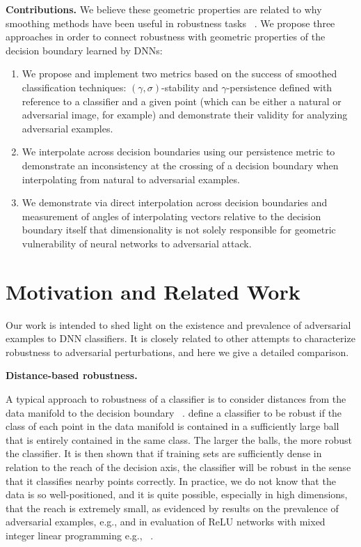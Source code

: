 {\bf Contributions.} We believe these geometric properties are related
to why smoothing methods have been useful in robustness tasks
~\citep{cohen2019certified, lecuyer2019certified, li2019certified}. We propose three approaches in order to connect robustness with geometric properties of the decision boundary learned by DNNs: 
\begin{enumerate}
    \item We propose and implement two metrics based on the success of smoothed classification techniques:  $(\gamma,\sigma)$-stability and $\gamma$-persistence defined with reference to a classifier and a given point (which can be either a natural or adversarial image, for example) and demonstrate their validity for analyzing adversarial examples. 
    \item We interpolate across decision boundaries using our persistence metric to demonstrate an inconsistency at the crossing of a decision boundary when interpolating from natural to adversarial examples.
    \item We demonstrate via direct interpolation across decision boundaries and measurement of angles of interpolating vectors relative to the decision boundary itself that dimensionality is not solely responsible for geometric vulnerability of neural networks to adversarial attack. 
\end{enumerate}

\section{Motivation and Related Work}

Our work is intended to shed light on the existence and prevalence of adversarial examples to DNN classifiers. It is closely related to other attempts to characterize robustness to adversarial perturbations, and here we give a detailed comparison.

{\bf Distance-based robustness.}

A typical approach to robustness of a classifier is to consider
distances from the data manifold to the decision boundary
~\citep{Wang2020Improving, xu2023exploring, he2018decision}.
\citet{khoury2018} define a classifier to be robust if the class of
each point in the data manifold is contained in a sufficiently large
ball that is entirely contained in the same class. The larger the
balls, the more robust the classifier. It is then shown that if
training sets are sufficiently dense in relation to the reach of the
decision axis, the classifier will be robust in the sense that it
classifies nearby points correctly. In practice, we do not know that
the data is so well-positioned, and it is quite possible, especially
in high dimensions, that the reach is extremely small, as evidenced by
results on the prevalence of adversarial examples, e.g.,
\citet{inevitable2018} and in evaluation of ReLU networks with mixed
integer linear programming e.g., ~\citet{tjeng2017evaluating}.

